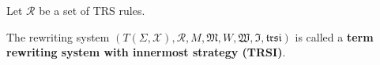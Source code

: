   \begin{definition}
    Let $\mathcal{R}$ be a set of TRS rules. 
  
    The rewriting system $(T(\Sigma,\mathcal{X}), \mathcal{R}, M, \mathfrak{M}, W, \mathfrak{W}, \mathfrak{I}, \mathfrak{trsi})$ is called a \textbf{term rewriting system with innermost strategy (TRSI)}.
  \end{definition}
  
